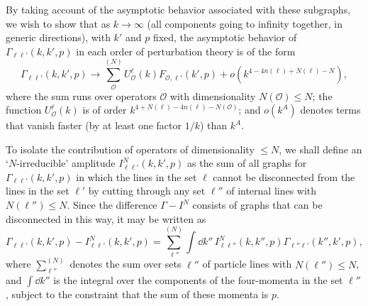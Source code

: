By taking account of the asymptotic behavior associated with these subgraphs, we wish to show that as $k\to\infty$ (all components going to infinity together, in generic directions), with $k'$ and $p$ fixed, the asymptotic behavior of $\Gamma_{\ell\ell'}(k,k',p)$ in each order of perturbation theory is of the form
\begin{equation}
\Gamma_{\ell\ell'}(k,k',p)
\longrightarrow
\sum_{\mathcal O}^{(N)}
U_{\mathcal O}^{\ell}(k)
F_{\mathcal O,\ell'}(k',p)
+o\left(k^{4-4n(\ell)+N(\ell)-N}\right),
\tag{20.A.4}\label{eq:20.A.4}
\end{equation}
where the sum runs over operators $\mathcal O$ with dimensionality $N(\mathcal O)\leq N$; the function $U_{\mathcal O}^{\ell}(k)$ is of order $k^{4+N(\ell)-4n(\ell)-N(\mathcal O)}$; and $o(k^A)$ denotes terms that vanish faster (by at least one factor $1/k$) than $k^A$.

To isolate the contribution of operators of dimensionality $\leq N$, we shall define an `$N$-irreducible' amplitude $I_{\ell\ell'}^N(k,k',p)$ as the sum of all graphs for $\Gamma_{\ell\ell'}(k,k',p)$ in which the lines in the set $\ell$ cannot be disconnected from the lines in the set $\ell'$ by cutting through any set $\ell''$ of internal lines with $N(\ell'')\leq N$. Since the difference $\Gamma-I^N$ consists of graphs that can be disconnected in this way, it may be written as
\begin{equation}
\Gamma_{\ell\ell'}(k,k',p)-I_{\ell\ell'}^N(k,k',p)
=\sum_{\ell''}^{(N)}
\int \dd k''\,
I_{\ell\ell''}^N(k,k'',p)
\Gamma_{\ell''\ell'}(k'',k',p),
\tag{20.A.5}\label{eq:20.A.5}
\end{equation}
where $\sum_{\ell''}^{(N)}$ denotes the sum over sets $\ell''$ of particle lines with $N(\ell'')\leq N$, and $\int \dd k''$ is the integral over the components of the four-momenta in the set $\ell''$, subject to the constraint that the sum of these momenta is $p$.

